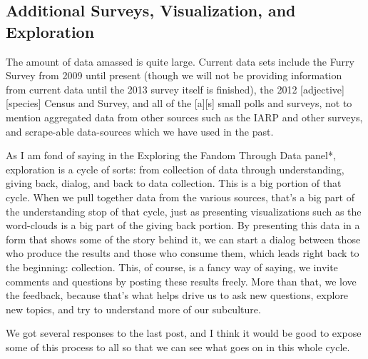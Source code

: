 \subsection*{Additional Surveys, Visualization, and Exploration}

The amount of data amassed is quite large.  Current data sets include the Furry Survey from 2009 until present (though we will not be providing information from current data until the 2013 survey itself is finished), the 2012 [adjective][species] Census and Survey, and all of the [a][s] small polls and surveys, not to mention aggregated data from other sources such as the IARP and other surveys, and scrape-able data-sources which we have used in the past.

As I am fond of saying in the Exploring the Fandom Through Data panel*, exploration is a cycle of sorts: from collection of data through understanding, giving back, dialog, and back to data collection.  This is a big portion of that cycle.  When we pull together data from the various sources, that's a big part of the understanding stop of that cycle, just as presenting visualizations such as the word-clouds is a big part of the giving back portion.  By presenting this data in a form that shows some of the story behind it, we can start a dialog between those who produce the results and those who consume them, which leads right back to the beginning: collection.  This, of course, is a fancy way of saying, we invite comments and questions by posting these results freely.  More than that, we love the feedback, because that's what helps drive us to ask new questions, explore new topics, and try to understand more of our subculture.

We got several responses to the last post, and I think it would be good to expose some of this process to all so that we can see what goes on in this whole cycle.

